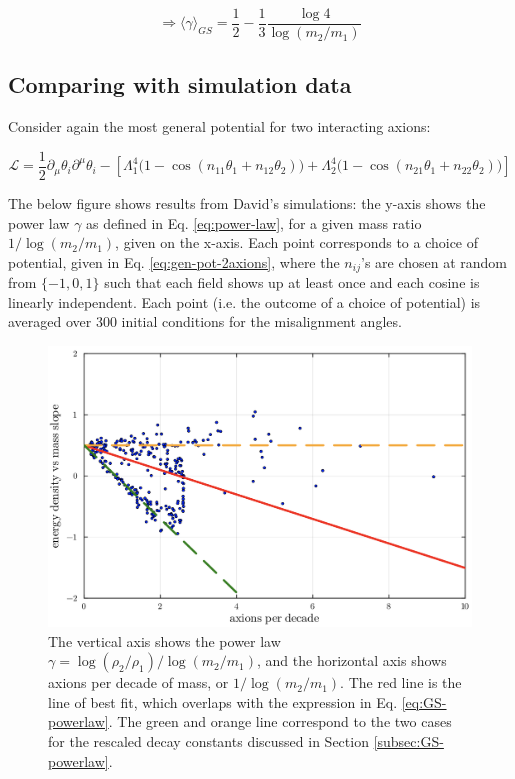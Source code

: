 \documentclass{article}
\begin{document}
\begin{equation}
    \label{eq:GS-powerlaw}
    \Rightarrow \langle \gamma\rangle_{GS}  = \frac{1}{2}-\frac{1}{3}\frac{\log{4}}{\log{(m_2/m_1)}}
\end{equation}

\subsection{Comparing with simulation data}

Consider again the most general potential for two interacting axions:

\begin{equation}
    \label{eq:gen-pot-2axions}
    \mathcal{L} = \frac{1}{2}\partial_\mu\theta_i\partial^\mu\theta_i-\left[\Lambda_1^4\big(1-\cos{(n_{11}\theta_1+n_{12}\theta_2)}\big) +\Lambda_2^4\big(1-\cos{(n_{21}\theta_1+n_{22}\theta_2)}\big)\right]
\end{equation}

The below figure shows results from David's simulations: the y-axis shows the power law $\gamma$ as defined in Eq. \eqref{eq:power-law}, for a given mass ratio $1/\log{(m_2/m_1)}$, given on the x-axis. Each point corresponds to a choice of potential, given in Eq. \eqref{eq:gen-pot-2axions}, where the $n_{ij}$'s are chosen at random from $\{-1,0,1\}$ such that each field shows up at least once and each cosine is linearly independent. Each point (i.e. the outcome of a choice of potential) is averaged over 300 initial conditions for the misalignment angles. 

\begin{figure}[h]
    \centering
    \includegraphics[width=0.9\linewidth]{figs/Slope_vs_ApD.png}
    \caption{The vertical axis shows the power law $\gamma = \log(\rho_2/\rho_1)/\log{(m_2/m_1)}$, and the horizontal axis shows axions per decade of mass, or $1/\log{(m_2/m_1)}$. The red line is the line of best fit, which overlaps with the expression in Eq. \eqref{eq:GS-powerlaw}. The green and orange line correspond to the two cases for the rescaled decay constants discussed in Section \ref{subsec:GS-powerlaw}.}
    \label{fig:2axions-powerlaw-apd}
\end{figure}
\end{document}
